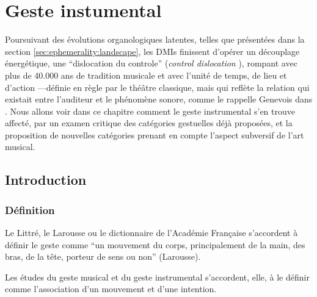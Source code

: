 %
\chapter{Geste instumental}
\label{ch:gesture}



\noindent Poursuivant des évolutions organologiques latentes, telles que présentées dans la section \ref{sec:ephemerality:landscape}, les \glspl{DMI} finissent d'opérer un découplage énergétique, une ``dislocation du controle'' (\textit{control dislocation} \cite{miranda_new_2006}), rompant avec plus de 40.000 ans de tradition musicale \cite{conard_new_2009} et avec l'unité de temps, de lieu et d'action —définie en règle par le théâtre classique, mais qui reflète la relation qui existait entre l'auditeur et le phénomène sonore, comme le rappelle Genevois dans \cite{cance_what_2012}. Nous allons voir dans ce chapitre comment le geste instrumental s'en trouve affecté, par un examen critique des catégories gestuelles déjà proposées, et la proposition de nouvelles catégories prenant en compte l'aspect subversif de l'art musical.


\section{Introduction}

\subsection{Définition}

Le Littré, le Larousse ou le dictionnaire de l'Académie Française s'accordent à définir le geste comme ``un mouvement du corps, principalement de la main, des bras, de la tête, porteur de sens ou non'' (Larousse).

Les études du geste musical et du geste instrumental s'accordent, elle, à le définir comme l'association d'un mouvement et d'une intention. 
 \cite{imberty_mouvement_2013}

